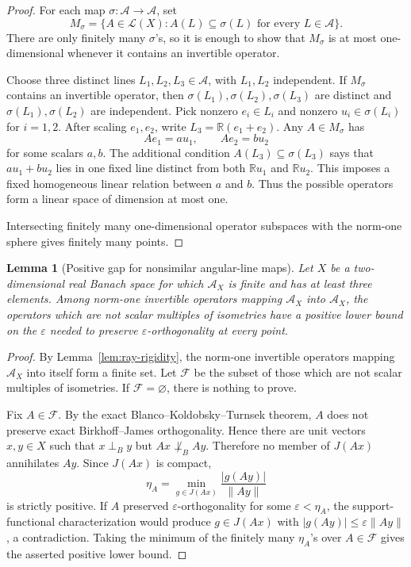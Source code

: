 \documentclass[11pt]{article}
\newtheorem{lemma}{Lemma}
\newcommand{\eps}{\varepsilon}
\newcommand{\R}{\mathbb R}
\newcommand{\cA}{\mathcal A}
\newcommand{\cL}{\mathcal L}
\newcommand{\cF}{\mathcal F}
\newcommand{\perpB}{\perp_B}
\begin{document}
\begin{proof}
For each map \(\sigma:\cA\to\cA\), set
\[
  M_\sigma=\{A\in\cL(X): A(L)\subseteq \sigma(L)\text{ for every }L\in\cA\}.
\]
There are only finitely many \(\sigma\)'s, so it is enough to show that
\(M_\sigma\) is at most one-dimensional whenever it contains an invertible
operator.

Choose three distinct lines \(L_1,L_2,L_3\in\cA\), with \(L_1,L_2\)
independent.  If \(M_\sigma\) contains an invertible operator, then
\(\sigma(L_1),\sigma(L_2),\sigma(L_3)\) are distinct and
\(\sigma(L_1),\sigma(L_2)\) are independent.  Pick nonzero \(e_i\in L_i\) and
nonzero \(u_i\in\sigma(L_i)\) for \(i=1,2\).  After scaling \(e_1,e_2\), write
\(L_3=\R(e_1+e_2)\).  Any \(A\in M_\sigma\) has
\[
  Ae_1=a u_1,\qquad Ae_2=b u_2
\]
for some scalars \(a,b\).  The additional condition
\(A(L_3)\subseteq\sigma(L_3)\) says that \(a u_1+b u_2\) lies in one fixed
line distinct from both \(\R u_1\) and \(\R u_2\).  This imposes a fixed
homogeneous linear relation between \(a\) and \(b\).  Thus the possible
operators form a linear space of dimension at most one.

Intersecting finitely many one-dimensional operator subspaces with the norm-one
sphere gives finitely many points.
\end{proof}

\begin{lemma}[Positive gap for nonsimilar angular-line maps]
\label{lem:gap}
Let \(X\) be a two-dimensional real Banach space for which \(\cA_X\) is finite
and has at least three elements.  Among norm-one invertible operators mapping
\(\cA_X\) into \(\cA_X\), the operators which are not scalar multiples of
isometries have a positive lower bound on the \(\eps\) needed to preserve
\(\eps\)-orthogonality at every point.
\end{lemma}

\begin{proof}
By Lemma~\ref{lem:ray-rigidity}, the norm-one invertible operators mapping
\(\cA_X\) into itself form a finite set.  Let \(\cF\) be the subset of those
which are not scalar multiples of isometries.  If \(\cF=\varnothing\), there is
nothing to prove.

Fix \(A\in\cF\).  By the exact Blanco--Koldobsky--Turnsek theorem, \(A\) does
not preserve exact Birkhoff--James orthogonality.  Hence there are unit vectors
\(x,y\in X\) such that \(x\perpB y\) but \(Ax\not\perpB Ay\).  Therefore no
member of \(J(Ax)\) annihilates \(Ay\).  Since \(J(Ax)\) is compact,
\[
  \eta_A=\min_{g\in J(Ax)}\frac{|g(Ay)|}{\|Ay\|}
\]
is strictly positive.  If \(A\) preserved \(\eps\)-orthogonality for some
\(\eps<\eta_A\), the support-functional characterization would produce
\(g\in J(Ax)\) with \(|g(Ay)|\leq\eps\|Ay\|\), a contradiction.  Taking the
minimum of the finitely many \(\eta_A\)'s over \(A\in\cF\) gives the asserted
positive lower bound.
\end{proof}
\end{document}
